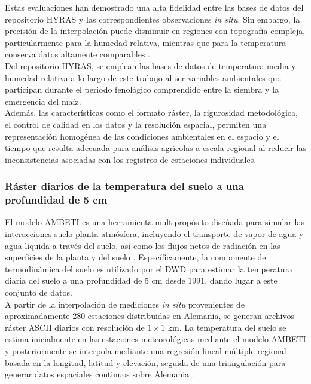 Estas evaluaciones han demostrado una alta fidelidad entre las bases de datos del repositorio HYRAS y las correspondientes observaciones \textit{in situ}. Sin embargo, la precisión de la interpolación puede disminuir en regiones con topografía compleja, particularmente para la humedad relativa, mientras que para la temperatura conserva datos altamente comparables \citep{Razafimaharo_2020}.\\

Del repositorio HYRAS, se emplean las bases de datos de temperatura media \citep{DWD_HYRAS_MeanTemp} y humedad relativa \citep{DWD_HYRAS_RelHumidity} a lo largo de este trabajo al ser variables ambientales que participan durante el periodo fenológico comprendido entre la siembra y la emergencia del maíz.\\

Además, las características como el formato ráster, la rigurosidad metodológica, el control de calidad en los datos y la resolución espacial, permiten una representación homogénea de las condiciones ambientales en el espacio y el tiempo que resulta adecuada para análisis agrícolas a escala regional al reducir las inconsistencias asociadas con los registros de estaciones individuales.\\

\subsubsection{Ráster diarios de la temperatura del suelo a una profundidad de 5 cm}

El modelo AMBETI es una herramienta multipropósito diseñada para simular las interacciones suelo-planta-atmósfera, incluyendo el transporte de vapor de agua y agua líquida a través del suelo, así como los flujos netos de radiación en las superficies de la planta y del suelo \citep{Braden_1995}. Específicamente, la componente de termodinámica del suelo es utilizado por el DWD para estimar la temperatura diaria del suelo a una profundidad de 5 cm desde 1991, dando lugar a este conjunto de datos.\\


A partir de la interpolación de mediciones \textit{in situ} provenientes de aproximadamente 280 estaciones distribuidas en Alemania, se generan archivos ráster ASCII diarios con resolución de $1\times1$ km. La temperatura del suelo se estima inicialmente en las estaciones meteorológicas mediante el modelo AMBETI y posteriormente se interpola mediante una regresión lineal múltiple regional basada en la longitud, latitud y elevación, seguida de una triangulación para generar datos espaciales continuos sobre Alemania \citep{DWD_soiltemperature}.\\

